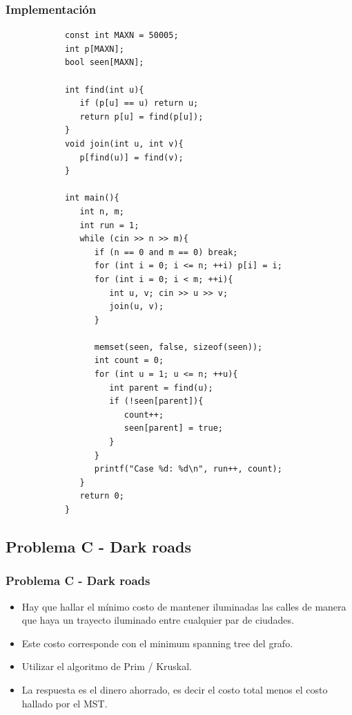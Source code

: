 \documentclass{beamer}
\begin{document}
	\begin{frame}
		\frametitle{Implementación}
		\begin{lstlisting}
			const int MAXN = 50005;
			int p[MAXN];
			bool seen[MAXN];

			int find(int u){
			   if (p[u] == u) return u;
			   return p[u] = find(p[u]);
			}
			void join(int u, int v){
			   p[find(u)] = find(v);
			}

			int main(){
			   int n, m;
			   int run = 1;
			   while (cin >> n >> m){
			      if (n == 0 and m == 0) break;
			      for (int i = 0; i <= n; ++i) p[i] = i;
			      for (int i = 0; i < m; ++i){
			         int u, v; cin >> u >> v;
			         join(u, v);
			      }
			
			      memset(seen, false, sizeof(seen));
			      int count = 0;
			      for (int u = 1; u <= n; ++u){
			         int parent = find(u);
			         if (!seen[parent]){
			            count++;
			            seen[parent] = true;
			         }
			      }
			      printf("Case %d: %d\n", run++, count);
			   }
			   return 0;
			}
		\end{lstlisting}
	\end{frame}
	
	\subsection{Problema C - Dark roads}
	\begin{frame}
		\frametitle{Problema C - Dark roads}
		\begin{itemize}
			\item Hay que hallar el mínimo costo de mantener iluminadas las calles de manera que haya un trayecto iluminado entre cualquier par de ciudades.
			\item Este costo corresponde con el minimum spanning tree del grafo.
			\item Utilizar el algoritmo de Prim / Kruskal.
			\item La respuesta es el dinero ahorrado, es decir el costo total menos el costo hallado por el MST.
		\end{itemize}
	\end{frame}
	
\end{document}
